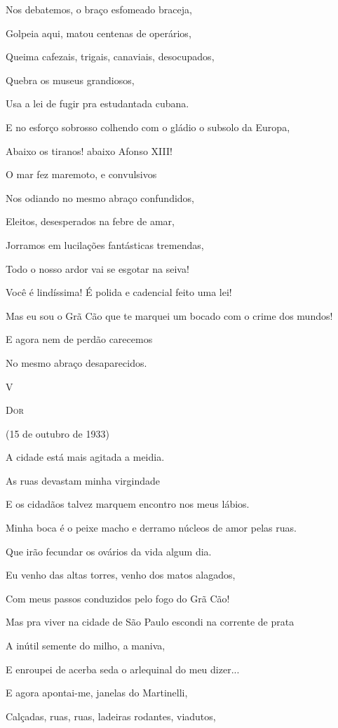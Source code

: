 Nos debatemos, o braço esfomeado braceja,

Golpeia aqui, matou centenas de operários,

Queima cafezais, trigais, canaviais, desocupados,

Quebra os museus grandiosos,

Usa a lei de fugir pra estudantada cubana.

E no esforço sobrosso colhendo com o gládio o subsolo da Europa,

Abaixo os tiranos! abaixo Afonso XIII!

O mar fez maremoto, e convulsivos

Nos odiando no mesmo abraço confundidos,

Eleitos, desesperados na febre de amar,

Jorramos em lucilações fantásticas tremendas,

Todo o nosso ardor vai se esgotar na seiva!

Você é lindíssima! É polida e cadencial feito uma lei!

Mas eu sou o Grã Cão que te marquei um bocado com o crime dos mundos!

E agora nem de perdão carecemos

No mesmo abraço desaparecidos.

V

\textsc{Dor}

(15 de outubro de 1933)

A cidade está mais agitada a meidia.

As ruas devastam minha virgindade

E os cidadãos talvez marquem encontro nos meus lábios.

Minha boca é o peixe macho e derramo núcleos de amor pelas ruas.

Que irão fecundar os ovários da vida algum dia.

Eu venho das altas torres, venho dos matos alagados,

Com meus passos conduzidos pelo fogo do Grã Cão!

Mas pra viver na cidade de São Paulo escondi na corrente de prata

A inútil semente do milho, a maniva,

E enroupei de acerba seda o arlequinal do meu dizer...

E agora apontai-me, janelas do Martinelli,

Calçadas, ruas, ruas, ladeiras rodantes, viadutos,

